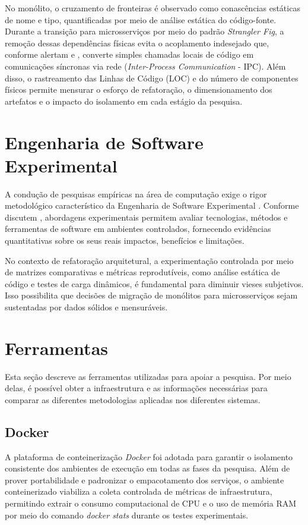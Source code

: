 No monólito, o cruzamento de fronteiras é observado como conascências estáticas de nome e tipo, quantificadas por meio de análise estática do código-fonte. Durante a transição para microsserviços por meio do padrão \textit{Strangler Fig}, a remoção dessas dependências físicas evita o acoplamento indesejado que, conforme alertam \textcite{newman2020} e \textcite{richardson2018}, converte simples chamadas locais de código em comunicações síncronas via rede (\textit{Inter-Process Communication} - IPC). Além disso, o rastreamento das Linhas de Código (LOC) e do número de componentes físicos permite mensurar o esforço de refatoração, o dimensionamento dos artefatos e o impacto do isolamento em cada estágio da pesquisa.

\section{Engenharia de Software Experimental}
\label{sec:eng_software_experimental}

A condução de pesquisas empíricas na área de computação exige o rigor metodológico característico da Engenharia de Software Experimental \cite{wohlin2012}. Conforme discutem \textcite{kitchenham2002}, abordagens experimentais permitem avaliar tecnologias, métodos e ferramentas de software em ambientes controlados, fornecendo evidências quantitativas sobre os seus reais impactos, benefícios e limitações.

No contexto de refatoração arquitetural, a experimentação controlada por meio de matrizes comparativas e métricas reprodutíveis, como análise estática de código e testes de carga dinâmicos, é fundamental para diminuir vieses subjetivos. Isso possibilita que decisões de migração de monólitos para microsserviços sejam sustentadas por dados sólidos e mensuráveis.

\section{Ferramentas}

Esta seção descreve as ferramentas utilizadas para apoiar a pesquisa. Por meio delas, é possível obter a infraestrutura e as informações necessárias para comparar as diferentes metodologias aplicadas nos diferentes sistemas.

\subsection*{Docker}
A plataforma de conteinerização \textit{Docker} foi adotada para garantir o isolamento consistente dos ambientes de execução em todas as fases da pesquisa. Além de prover portabilidade e padronizar o empacotamento dos serviços, o ambiente conteinerizado viabiliza a coleta controlada de métricas de infraestrutura, permitindo extrair o consumo computacional de CPU e o uso de memória RAM por meio do comando \textit{docker stats} durante os testes experimentais.

